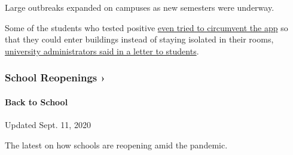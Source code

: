 Large outbreaks expanded on campuses as new semesters were underway.

Some of the students who tested positive
\href{https://dailyillini.com/covid-10/2020/09/02/live-university-holds-news-conference-after-on-campus-covid-19-spike/}{even
tried to circumvent the app} so that they could enter buildings instead
of staying isolated in their rooms,
\href{https://massmail.illinois.edu/massmail/61640956.html}{university
administrators said in a letter to students}.

\href{https://www.nytimes3xbfgragh.onion/spotlight/schools-reopening?action=click\&pgtype=Article\&state=default\&region=MAIN_CONTENT_3\&context=storylines_keepup}{}

\hypertarget{school-reopenings-}{%
\subsubsection{School Reopenings ›}\label{school-reopenings-}}

\hypertarget{back-to-school}{%
\paragraph{Back to School}\label{back-to-school}}

Updated Sept. 11, 2020

The latest on how schools are reopening amid the pandemic.

